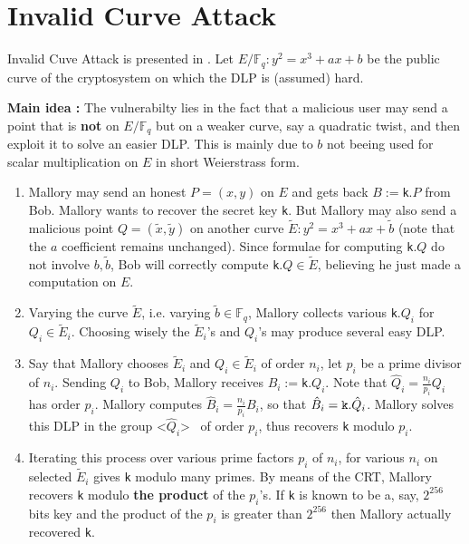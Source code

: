 \documentclass[10pt]{article}
\theoremstyle{definition}
\newcommand{\F}{\mathbb{F}}
\begin{document}
\section{Invalid Curve Attack}

Invalid Cuve Attack is presented in \cite{FLRV08}.
Let $E/\F_q : y^2 = x^3+ax+b$ be the public curve of the cryptosystem on which the DLP is (assumed) hard.

\vspace*{.5cm}
\textbf{Main idea :} The vulnerabilty lies in the fact that a malicious user may send a point that is \textbf{not} on $E/\F_q$ but on a weaker curve, say a quadratic twist, and then exploit it to solve an easier DLP.
This is mainly due to $b$ not beeing used for scalar multiplication on $E$ in short Weierstrass form.

\begin{enumerate}
\item Mallory may send an honest $P = (x,y)$ on $E$ and gets back $B:=$\verb|k|$.P$ from Bob.
Mallory wants to recover the secret key \verb|k|.
But Mallory may also send a malicious point $Q = ( \tilde{x},\tilde{y})$ 
on another curve $\tilde{E} : y^2 = x^3+ax+\tilde{b}$ (note that the $a$ coefficient remains unchanged).
Since formulae for computing \verb|k|$.Q$ do not involve $b, \tilde{b}$, Bob will correctly compute \verb|k|$.Q \in \tilde{E}$, believing he just made a computation on $E$.
\item Varying the curve $\tilde{E}$,  i.e. varying $\tilde{b} \in \F_q$, Mallory collects various \verb|k|$.Q_i$ for $Q_i \in \tilde{E}_i$.
Choosing wisely the $\tilde{E}_i$'s and $Q_i$'s may produce several easy DLP.
\item Say that Mallory chooses $\tilde{E}_i$ and  $Q_i \in \tilde{E}_i$ of order $n_i$, let $p_i$ be a prime divisor of $n_i$.
Sending $Q_i$ to Bob, Mallory receives $B_i:=$\verb|k|$.Q_i$.
Note that $\hat{Q}_i=\frac{n_i}{p_i}Q_i$ has order $p_i$.
Mallory computes $\hat{B}_i=\frac{n_i}{p_i}B_i$, so that $\hat{B}_i =  \verb|k|.\hat{Q}_i$.
Mallory solves this DLP in the group \textless$\hat{Q}_i$\textgreater~ of order $p_i$, thus recovers \verb|k| modulo $p_i$. 
\item Iterating this process over various prime factors $p_i$ of $n_i$, for various $n_i$ on selected $\tilde{E}_i$ gives \verb|k| modulo many primes.
By means of the CRT, Mallory recovers \verb|k| modulo \textbf{the product} of the $p_i$'s.
If \verb|k| is known to be a, say, $2^{256}$ bits key and the product of the $p_i$ is greater than $2^{256}$ then Mallory actually recovered  \verb|k|.
\end{enumerate}
\end{document}
